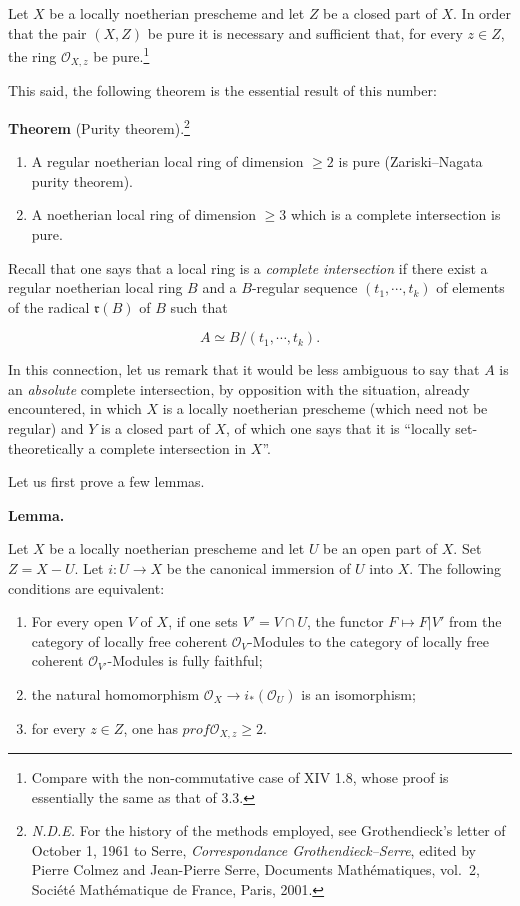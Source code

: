 \documentclass[
]{article}
\providecommand{\tightlist}{%
  \setlength{\itemsep}{0pt}\setlength{\parskip}{0pt}}
\begin{document}
Let \(X\) be a locally noetherian prescheme and let \(Z\) be a closed
part of \(X\). In order that the pair \((X, Z)\) be pure it is necessary
and sufficient that, for every \(z \in Z\), the ring
\(\mathcal{O}_{X,z}\) be pure.\footnote{Compare with the non-commutative
  case of XIV 1.8, whose proof is essentially the same as that of 3.3.}

This said, the following theorem is the essential result of this number:

\textbf{Theorem} (Purity theorem).\footnote{\emph{N.D.E.} For the
  history of the methods employed, see Grothendieck's letter of October
  1, 1961 to Serre, \emph{Correspondance Grothendieck--Serre}, edited by
  Pierre Colmez and Jean-Pierre Serre, Documents Mathématiques, vol.~2,
  Société Mathématique de France, Paris, 2001.}

\begin{enumerate}
\def\labelenumi{\arabic{enumi}.}
\tightlist
\item
  A regular noetherian local ring of dimension \(\geqslant 2\) is pure
  (Zariski--Nagata purity theorem).
\item
  A noetherian local ring of dimension \(\geqslant 3\) which is a
  complete intersection is pure.
\end{enumerate}

Recall that one says that a local ring is a \emph{complete intersection}
if there exist a regular noetherian local ring \(B\) and a \(B\)-regular
sequence \((t_{1}, \cdots, t_{k})\) of elements of the radical
\(\mathfrak{r}(B)\) of \(B\) such that

\[
A \simeq B/(t_{1}, \cdots, t_{k}).
\]

In this connection, let us remark that it would be less ambiguous to say
that \(A\) is an \emph{absolute} complete intersection, by opposition
with the situation, already encountered, in which \(X\) is a locally
noetherian prescheme (which need not be regular) and \(Y\) is a closed
part of \(X\), of which one says that it is ``locally set-theoretically
a complete intersection in \(X\)''.

Let us first prove a few lemmas.

\textbf{Lemma.}

Let \(X\) be a locally noetherian prescheme and let \(U\) be an open
part of \(X\). Set \(Z = X - U\). Let \(i: U \to X\) be the canonical
immersion of \(U\) into \(X\). The following conditions are equivalent:

\begin{enumerate}
\def\labelenumi{\arabic{enumi}.}
\tightlist
\item
  For every open \(V\) of \(X\), if one sets \(V' = V \cap U\), the
  functor \(F \mapsto F|V'\) from the category of locally free coherent
  \(\mathcal{O}_{V}\)-Modules to the category of locally free coherent
  \(\mathcal{O}_{V'}\)-Modules is fully faithful;
\item
  the natural homomorphism
  \(\mathcal{O}_{X} \to i_{*}(\mathcal{O}_{U})\) is an isomorphism;
\item
  for every \(z \in Z\), one has \(prof \mathcal{O}_{X,z} \geqslant 2\).
\end{enumerate}
\end{document}
